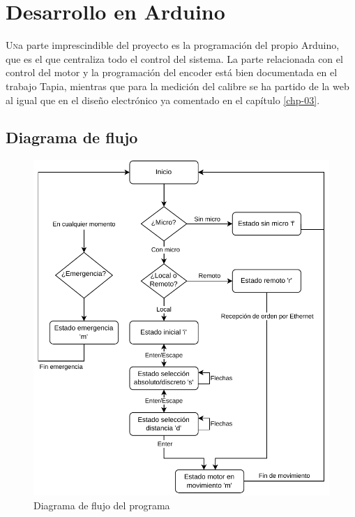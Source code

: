 \chapter{Desarrollo en Arduino}\label{chp-05}

\lettrine[lraise=-0.1, lines=2, loversize=0.2]{U}na parte imprescindible del proyecto es la programación del propio Arduino, que es el que centraliza todo el control del sistema. La parte relacionada con el control del motor y la programación del encoder está bien documentada en el trabajo Tapia\cite{tapia}, mientras que para la medición del calibre se ha partido de la web \cite{caliper} al igual que en el diseño electrónico ya comentado en el capítulo \ref{chp-03}.

\section{Diagrama de flujo}

\begin{figure}[hbtp]
    \centering
    \includegraphics[height=0.5\textheight]{05-arduino/diagramaflujo.pdf}
    \caption{Diagrama de flujo del programa}
    \label{fig:diagramaflujo}
    \end{figure}

